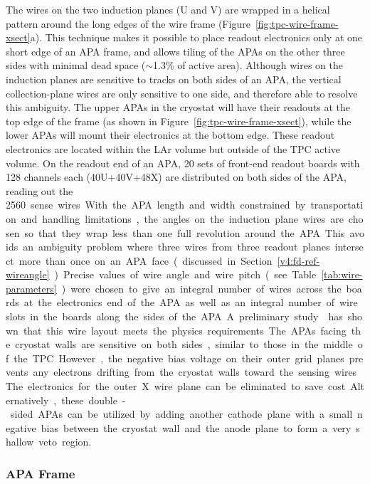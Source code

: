 The wires on the two induction planes (U and V) are wrapped in a
helical pattern around the long edges of the wire frame
(Figure~\ref{fig:tpc-wire-frame-xsect}a). This technique makes it
possible to place readout electronics only at one short edge of an APA
frame, and allows tiling of the APAs on the other three sides with
minimal dead space ($\sim$1.3\% of active area).  Although wires on the %
induction planes are sensitive to tracks on both sides of an APA,
the vertical collection-plane wires are only sensitive to one side, and
therefore able to resolve this ambiguity.  The upper APAs in the
cryostat will have their readouts at the top edge of the frame (as
shown in Figure~\ref{fig:tpc-wire-frame-xsect}), while the lower APAs
will mount their electronics at the bottom edge.  These readout
electronics are located within the LAr volume but  outside of the TPC active volume.  On the
readout end of an APA, 20 sets of front-end readout boards with 128
channels each (40U+40V+48X) are distributed on both sides of the APA,
reading out the \SI{2560} sense wires.

With the APA length and width constrained by transportation and handling
limitations, the angles on the induction plane wires are chosen so
that they wrap less than one full revolution around the APA.  This
avoids an ambiguity problem where three wires from three readout
planes intersect more than once on an APA face (discussed in 
Section~\ref{v4:fd-ref-wireangle}).  Precise values of
wire angle and wire pitch (see Table~\ref{tab:wire-parameters}) were
chosen to give an integral number of wires across the boards at the
electronics end of the APA as well as an integral number of wire slots
in the boards along the sides of the APA.  A preliminary
study\cite{wire-orientation} has shown that this wire layout meets the
physics requirements.

The APAs facing the cryostat walls are sensitive on both sides, similar to
 those in the middle of the TPC.  However, the negative bias
voltage on their outer grid planes prevents any electrons drifting
from the cryostat walls toward the sensing wires.  The electronics for
the outer X wire plane can be eliminated to save cost.  Alternatively, %
these double-sided APAs can be utilized by adding another cathode plane
with a small negative bias between the cryostat wall and the anode plane to
form a very shallow veto region.

\subsubsection{APA Frame}
\label{subsec:fd-ref-apaframes}

